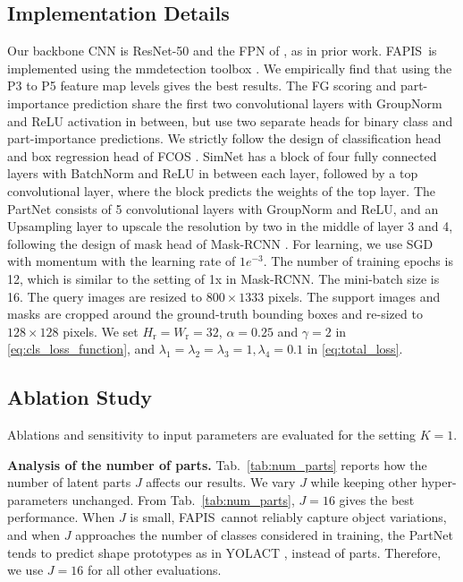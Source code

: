 \documentclass[final]{cvpr}
\def\Approach{FAPIS}
\begin{document}
\subsection{Implementation Details}
\label{sec:implement}

Our backbone CNN is ResNet-50 \cite{he2015deep} and the FPN of \cite{lin2017feature}, as in prior work.  \Approach~is implemented using the mmdetection toolbox \cite{chen2019mmdetection}. We empirically find that using the P3 to P5 feature map levels gives the best results. %
The FG scoring and part-importance prediction share the first two convolutional layers with GroupNorm \cite{wu2018group} and ReLU activation in between, but use two separate heads for binary class and part-importance predictions. We strictly follow the design of classification head and box regression head of FCOS \cite{tian2019fcos}. SimNet has a block of four fully connected layers with BatchNorm \cite{ioffe2015batch} and ReLU in between each layer, followed by a top convolutional layer, where the block predicts the weights of the top layer.
The PartNet consists of 5 convolutional layers with GroupNorm and ReLU, and an Upsampling layer to upscale the resolution by two in the middle of layer 3 and 4, following the design of mask head of Mask-RCNN \cite{he2017mask}. 
For learning, we use SGD with momentum \cite{cortes1995support} with the learning rate of $1e^{-3}$.
The number of training epochs is 12, which is similar to the setting of 1x in Mask-RCNN. The mini-batch size is 16. The query images are resized to $800{\times}1333$ pixels. The support images and masks are cropped around the ground-truth bounding boxes and re-sized to $128 \times 128$ pixels. We set $H_{\text{r}}=W_{\text{r}}=32$,  $\alpha =0.25$ and $\gamma =2$ in \eqref{eq:cls_loss_function}, and  $\lambda_1 = \lambda_2 = \lambda_3 = 1, \lambda_4 = 0.1$ in \eqref{eq:total_loss}. 




\subsection{Ablation Study}
Ablations and sensitivity to input parameters are evaluated for the setting $K=1$.  


{\bf Analysis of the number of parts.}
Tab.~\ref{tab:num_parts} reports how the number of latent parts $J$ affects our results. We vary $J$ while keeping other hyper-parameters unchanged. From Tab.~\ref{tab:num_parts}, $J=16$ gives the best performance. When $J$ is small, \Approach~cannot reliably capture object variations, and when $J$ approaches the number of classes considered in training, the PartNet tends to predict shape prototypes as in YOLACT \cite{bolya2019yolact}, instead of parts. Therefore, we use $J=16$ for all other evaluations. 
\end{document}
